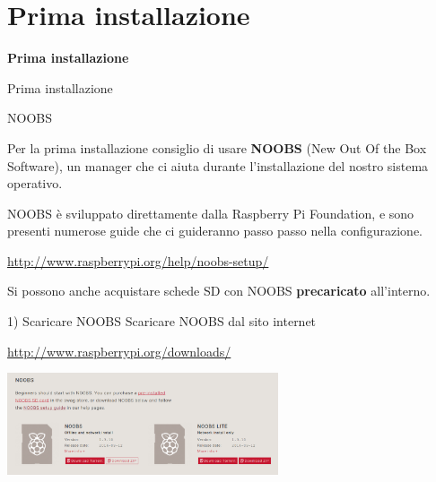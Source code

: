 \documentclass[xcolor=svgnames,11pt]{beamer}
\begin{document}
\section{Prima installazione}

\begin{frame}{}
\begin{center}
\begin{Huge}
{\color{green_raspi} \textbf{Prima installazione}}
\end{Huge}
\end{center}
\end{frame}

\begin{frame}{Prima installazione}
\begin{block}{NOOBS}

Per la prima installazione consiglio di usare \textbf{NOOBS} (New Out Of the Box Software), un manager che ci aiuta durante l'installazione del nostro sistema operativo.

\end{block}

\pause
\medskip

NOOBS \`e sviluppato direttamente dalla Raspberry Pi Foundation, e sono presenti numerose guide che ci guideranno passo passo nella configurazione.

\pause
\medskip
\begin{center}
\url{http://www.raspberrypi.org/help/noobs-setup/}
\end{center}

\pause
\medskip

Si possono anche acquistare schede SD con NOOBS \textbf{precaricato} all'interno.

\end{frame}

\begin{frame}{1) Scaricare NOOBS}
Scaricare NOOBS dal sito internet
\begin{center}
\url{http://www.raspberrypi.org/downloads/}

\bigskip
\includegraphics[width=8cm]{guide/1.png}

\end{center}
\end{frame}
\end{document}

